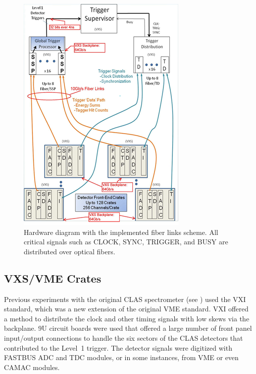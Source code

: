 \begin{figure}[hbt]
	\centering
	\includegraphics[width=1.0\columnwidth,keepaspectratio]{img/hardware_diagram.png}
	\caption{Hardware diagram with the implemented fiber links scheme. All critical signals such as CLOCK, SYNC,
          TRIGGER, and BUSY are distributed over optical fibers.}
	\label{fig:hardwarediagram}
\end{figure}

\subsection{VXS/VME Crates}

Previous experiments with the original CLAS spectrometer (see \cite{clas-nim}) used the VXI standard, which was a new
extension of the original VME standard. VXI offered a method to distribute the clock and other timing signals with low
skews via the backplane. 9U circuit boards were used that offered a large number of front panel input/output connections
to handle the six sectors of the CLAS detectors that contributed to the Level~1 trigger. The detector signals were
digitized with FASTBUS ADC and TDC modules, or in some instances, from VME or even CAMAC modules. 

